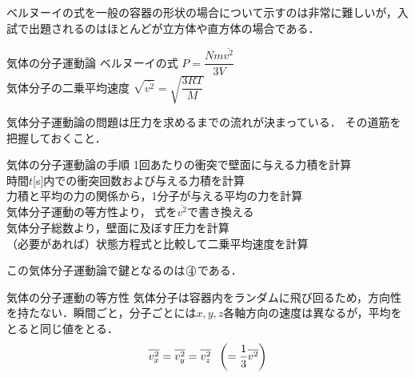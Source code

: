 ベルヌーイの式を一般の容器の形状の場合について示すのは非常に難しいが，入試で出題されるのはほとんどが立方体や直方体の場合である．

\begin{matome}{気体の分子運動論}
 \hspace{3mm} ベルヌーイの式\hspace{23mm} $P=\dfrac{Nm\overline{v^2}}{3V} $\\
 \hspace{3mm} 気体分子の二乗平均速度\hspace{10mm} $\sqrt{\overline{v^2}}=\sqrt{\dfrac{3RT}{M}}$ 
 \end{matome}
 
 気体分子運動論の問題は圧力を求めるまでの流れが決まっている．
 その道筋を把握しておくこと．
 
 \begin{matome}{気体の分子運動論の手順}
 \hspace{3mm} \hspace{2mm} 1回あたりの衝突で壁面に与える力積を計算\\
 \hspace{3mm} \hspace{2mm} 時間$t$[s]内での衝突回数および与える力積を計算\\
 \hspace{3mm} \hspace{2mm} 力積と平均の力の関係から，1分子が与える平均の力を計算\\
 \hspace{3mm} \hspace{2mm} 気体分子運動の等方性より， 式を$\overline{v^2}$で書き換える\\
 \hspace{3mm} \hspace{2mm} 気体分子総数より，壁面に及ぼす圧力を計算\\
 \hspace{3mm} \hspace{2mm} （必要があれば）状態方程式と比較して二乗平均速度を計算
 \end{matome}
 
 この気体分子運動論で鍵となるのは$\MARU{4}$である．
 
 \begin{matome}{気体の分子運動の等方性}
 \hspace{3mm} 気体分子は容器内をランダムに飛び回るため，方向性を持たない．瞬間ごと，分子ごとには$x,y,z$各軸方向の速度は異なるが，平均をとると同じ値をとる．
 \[ \overline{v_x^2}=\overline{v_y^2}=\overline{v_z^2} \hspace{2mm} \left(=\dfrac{1}{3} \overline{v^2} \right) \]
 \end{matome}
 
